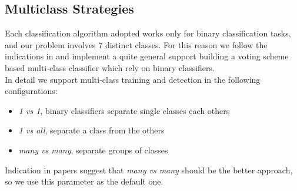 \subsection{Multiclass Strategies}

Each classification algorithm adopted works only for binary classification tasks, and our problem involves 7 distinct classes. For this reason we follow the indications in \cite{Littlewort04dynamicsof, Bartlett06fullyautomatic} and implement a quite general support building a voting scheme based multi-class classifier which rely on binary classifiers.\\
In detail we support multi-class training and detection in the following configurations:

\begin{itemize}
\item \emph{1 vs 1}, binary classifiers separate single classes each others
\item \emph{1 vs all}, separate a class from the others
\item \emph{many vs many}, separate groups of classes
\end{itemize}

Indication in papers suggest that \emph{many vs many} should be the better approach, so we use this parameter as the default one.
\newpage

